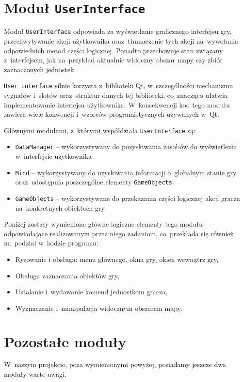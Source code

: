 \documentclass[licencjacka]{pracamgr}
\begin{document}
  \section{Moduł \texttt{UserInterface}}
    Moduł \texttt{UserInterface} odpowiada za wyświetlanie graficznego interfejsu gry, przechwytywanie akcji użytkownika
    oraz~tłumaczenie tych akcji na~wywołania odpowiednich metod części logicznej. Ponadto przechowuje stan związany
    z~interfejsem, jak na~przykład aktualnie widoczny obszar mapy czy zbiór zaznaczonych jednostek.

    \texttt{User Interface} silnie korzysta z~biblioteki Qt, w~szczególności mechanizmu sygnałów i~slotów oraz~struktur danych
    tej biblioteki, co~znacząco ułatwia implementowanie interfejsu użytkownika. W~konsekwencji kod tego modułu zawiera wiele
    konwencji i~wzorców programistycznych używanych w~Qt.

    Głównymi modułami, z~którymi współdziała \texttt{UserInterface} są:
    \begin{itemize}
     \item \texttt{DataManager} -- wykorzystywany do pozyskiwania zasobów do wyświetlenia w~interfejsie użytkownika
     \item \texttt{Mind} -- wykorzystywany do uzyskiwania informacji o~globalnym stanie gry oraz~udostępnia poszczególne elementy \texttt{GameObjects}
     \item \texttt{GameObjects} -- wykorzystywane do przekazania części logicznej akcji gracza na~konkretnych obiektach gry
    \end{itemize}

    Poniżej zostały wymienione główne logiczne elementy tego modułu odpowiadające realizowanym przez niego zadaniom,
    co~przekłada się również na~podział w~kodzie programu:

    \begin{itemize}
     \item Rysowanie i obsługa: menu głównego, okna gry, okien wewnątrz gry,
     \item Obsługa zaznaczania obiektów gry,
     \item Ustalanie i~wydawanie komend jednostkom gracza,
     \item Wyznaczanie i~manipulacja widocznym obszarem mapy.
    \end{itemize}

  \section{Pozostałe moduły}
    W~naszym projekcie, poza wymienionymi powyżej, posiadamy jeszcze dwa moduły warte uwagi.
\end{document}
